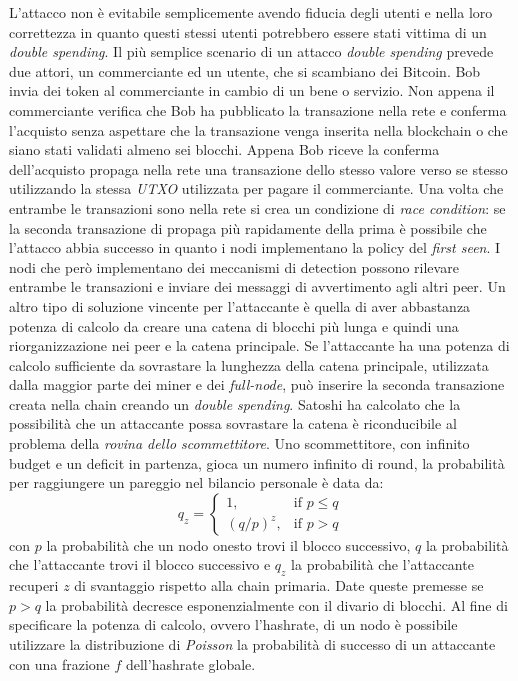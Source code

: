 L'attacco non è evitabile semplicemente avendo fiducia degli utenti e nella loro correttezza in quanto questi stessi utenti potrebbero essere stati vittima di un \textit{double spending}.\newline
Il più semplice scenario di un attacco \textit{double spending} prevede due attori, un commerciante ed un utente, che si scambiano dei Bitcoin. Bob invia dei token al commerciante in cambio di un bene o servizio. Non appena il commerciante verifica che Bob ha pubblicato la transazione nella rete e conferma l'acquisto senza aspettare che la transazione venga inserita nella blockchain o che siano stati validati almeno sei blocchi. Appena Bob riceve la conferma dell'acquisto propaga nella rete una transazione dello stesso valore verso se stesso utilizzando la stessa \textit{UTXO} utilizzata per pagare il commerciante.\newline
Una volta che entrambe le transazioni sono nella rete si crea un condizione di \textit{race condition}: se la seconda transazione di propaga più rapidamente della prima è possibile che l'attacco abbia successo in quanto i nodi implementano la policy del \textit{first seen}. I nodi che però implementano dei meccanismi di detection possono rilevare entrambe le transazioni e inviare dei messaggi di avvertimento agli altri peer.\newline
Un altro tipo di soluzione vincente per l'attaccante è quella di aver abbastanza potenza di calcolo da creare una catena di blocchi più lunga e quindi una riorganizzazione nei peer e la catena principale. Se l'attaccante ha una potenza di calcolo sufficiente da sovrastare la lunghezza della catena principale, utilizzata dalla maggior parte dei miner e dei \textit{full-node}, può inserire la seconda transazione creata nella chain creando un \textit{double spending}.\newline
Satoshi ha calcolato che la possibilità che un attaccante possa sovrastare la catena è riconducibile al problema della \textit{rovina dello scommettitore}. Uno scommettitore, con infinito budget e un deficit in partenza, gioca un numero infinito di round, la probabilità per raggiungere un pareggio nel bilancio personale è data da:
\begin{equation}
    q_{z}= \begin{cases}1, & \mbox{if }p\le q \\ (q/p)^{z}, & \mbox{if } p>q\end{cases}
\end{equation}
con $p$ la probabilità che un nodo onesto trovi il blocco successivo, $q$ la probabilità che l'attaccante trovi il blocco successivo e $q_{z}$ la probabilità che l'attaccante recuperi $z$ di svantaggio rispetto alla chain primaria. Date queste premesse se $p>q$ la probabilità decresce esponenzialmente con il divario di blocchi. Al fine di specificare la potenza di calcolo, ovvero l'hashrate, di un nodo è possibile utilizzare la distribuzione di \textit{Poisson} la probabilità di successo di un attaccante con una frazione $f$ dell'hashrate globale.
